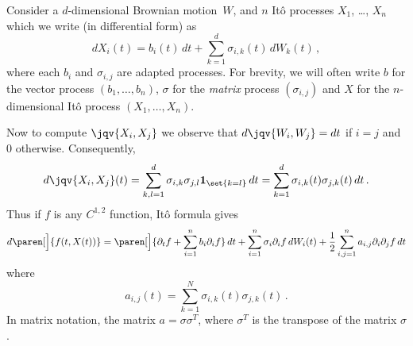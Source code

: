 \begin{example}
Consider a $d$-dimensional Brownian motion~$W$, and $n$ It\^o processes $X_1$, \dots, $X_n$ which we write (in differential form) as
\begin{equation*}
  dX_i(t) = b_i(t) \, dt + \sum_{k=1}^{d} \sigma_{i,k}(t) \, dW_k(t)\,,
\end{equation*}
where each $b_i$ and $\sigma_{i,j}$ are adapted processes.
For brevity, we will often write $b$ for the vector process $(b_1, \dots, b_n)$, $\sigma$ for the \emph{matrix} process $(\sigma_{i,j})$ and $X$ for the $n$-dimensional It\^o process $(X_1, \dots, X_n)$.

Now to compute $\jqv{X_i, X_j}$ we observe that $d\jqv{W_i, W_j} =  dt$ if $i = j$ and $0$ otherwise.
Consequently,
\begin{equation*}
  d \jqv{X_i, X_j}(t)
    = \sum_{k,l=1}^d \sigma_{i,k} \sigma_{j,l} \one_{\set{k=l}} \, dt
    = \sum_{k=1}^d \sigma_{i,k}(t) \sigma_{j, k}(t) \, dt\,.
\end{equation*}
Thus if $f$ is any $C^{1,2}$ function, It\^o formula gives
\begin{equation*}
  d\paren[\Big]{ f(t, X(t)) }
    = \paren[\Big]{\partial_t f + \sum_{i=1}^{n} b_i \partial_i f} \, dt
      + \sum_{i=1}^{n} \sigma_i \partial_i f \, dW_i(t)
      + \frac{1}{2} \sum_{i,j=1}^n a_{i,j} \partial_i \partial_j f \, dt
\end{equation*}
where
\begin{equation*}
  a_{i,j}(t) = \sum_{k=1}^{N} \sigma_{i,k}(t) \sigma_{j, k}(t)\,.
\end{equation*}
In matrix notation, the matrix $a = \sigma \sigma^T$, where $\sigma^T$ is the transpose of the matrix $\sigma$.
\end{example}

\iffalse
\begin{proposition}
  If $b$ be any adapted process, $W$ is a one dimensional Brownian motion, and
  \begin{equation*}
    X(t)
      = \paren[\Big]{W(t) + \int_0^t b(s) \, ds}
	  \exp\paren[\Big]{
	    - \int_0^t b(s) \, dW(s)
	    - \frac{1}{2}\int_0^t b(s)^2 \, ds
	  }\,,
  \end{equation*}
  then $X$ is a martingale.
\end{proposition}
\begin{proof}
  Define
  \begin{equation*}
    Y(t) = \paren[\Big]{W(t) + \int_0^t b(s) \, ds}
    \quad\text{and}\quad
    Z(t) = \exp\paren[\Big]{
	    - \int_0^t b(s) \, dW(s)
	    - \frac{1}{2}\int_0^t b(s)^2 \, ds
	  }\,.
  \end{equation*}
\end{proof}
\fi



